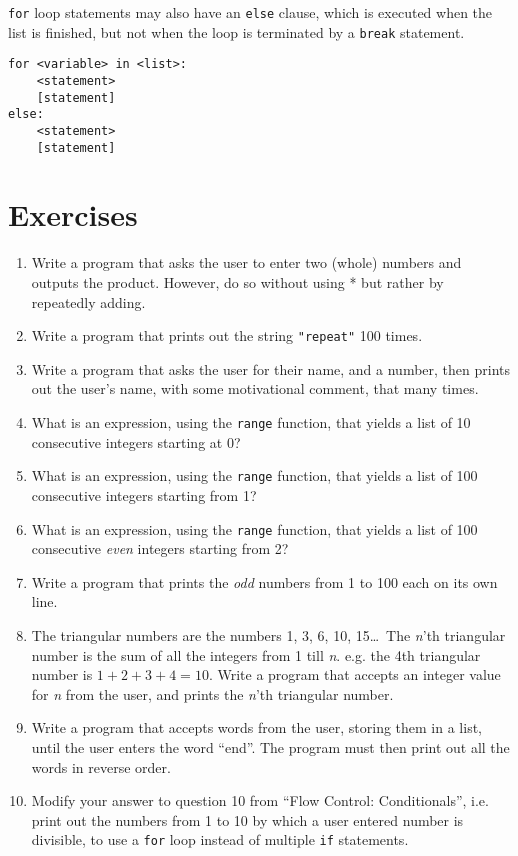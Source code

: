 \texttt{for} loop statements may also have an \texttt{else} clause, which is   executed when the list is finished, but not when the loop is   terminated by a \texttt{break} statement.
\begin{lstlisting}
for <variable> in <list>:
    <statement>
    [statement]
else:
    <statement>
    [statement]
\end{lstlisting}

\section{Exercises}
\begin{enumerate}
	\item Write a program that asks the user to enter two (whole) numbers and outputs the product. However, do so without using * but rather by repeatedly adding.
	\item Write a program that prints out the string \texttt{"repeat"} 100 times.
	\item Write a program that asks the user for their name, and a    number, then prints out the user's name, with some motivational comment, that many times.
	\item What is an expression, using the \texttt{range} function, that yields a    list of 10 consecutive integers starting at 0?
	\item What is an expression, using the \texttt{range} function, that yields a    list of 100 consecutive integers starting from 1?
	\item What is an expression, using the \texttt{range} function, that yields a    list of 100 consecutive \textit{even} integers starting    from 2?
	\item Write a program that prints the \textit{odd} numbers from 1 to 100 each on    its own line.
	\item The triangular numbers are the numbers 1, 3, 6, 10, 15\ldots\ The \textit{n}'th triangular number is the sum of all the integers from 1 till \textit{n}. e.g. the 4th triangular number is $1+2+3+4=10$. Write a program that accepts an integer value for \textit{n} from the user, and prints the \textit{n}'th triangular number.
	\item Write a program that accepts words from the user, storing them in a list, until the user enters the word ``end''. The program must then print out all the words in reverse order.
	\item Modify your answer to question 10 from ``Flow Control:    Conditionals'', i.e. print out the numbers from 1 to 10 by which a    user entered number is divisible, to use a \texttt{for} loop instead of    multiple \texttt{if} statements.

\end{enumerate}
